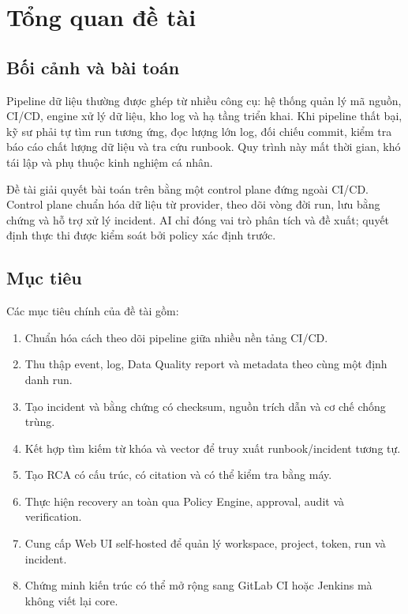 \documentclass[12pt,a4paper,oneside]{report}
\begin{document}
\tableofcontents
\listoffigures
\listoftables
\clearpage
{}

\chapter{Tổng quan đề tài}

\section{Bối cảnh và bài toán}

Pipeline dữ liệu thường được ghép từ nhiều công cụ: hệ thống quản lý mã nguồn, CI/CD, engine xử
lý dữ liệu, kho log và hạ tầng triển khai. Khi pipeline thất bại, kỹ sư phải tự tìm run tương ứng,
đọc lượng lớn log, đối chiếu commit, kiểm tra báo cáo chất lượng dữ liệu và tra cứu runbook. Quy
trình này mất thời gian, khó tái lập và phụ thuộc kinh nghiệm cá nhân.

Đề tài giải quyết bài toán trên bằng một control plane đứng ngoài CI/CD. Control plane chuẩn hóa
dữ liệu từ provider, theo dõi vòng đời run, lưu bằng chứng và hỗ trợ xử lý incident. AI chỉ đóng
vai trò phân tích và đề xuất; quyết định thực thi được kiểm soát bởi policy xác định trước.

\section{Mục tiêu}

Các mục tiêu chính của đề tài gồm:

\begin{enumerate}
  \item Chuẩn hóa cách theo dõi pipeline giữa nhiều nền tảng CI/CD.
  \item Thu thập event, log, Data Quality report và metadata theo cùng một định danh run.
  \item Tạo incident và bằng chứng có checksum, nguồn trích dẫn và cơ chế chống trùng.
  \item Kết hợp tìm kiếm từ khóa và vector để truy xuất runbook/incident tương tự.
  \item Tạo RCA có cấu trúc, có citation và có thể kiểm tra bằng máy.
  \item Thực hiện recovery an toàn qua Policy Engine, approval, audit và verification.
  \item Cung cấp Web UI self-hosted để quản lý workspace, project, token, run và incident.
  \item Chứng minh kiến trúc có thể mở rộng sang GitLab CI hoặc Jenkins mà không viết lại core.
\end{enumerate}
\end{document}
